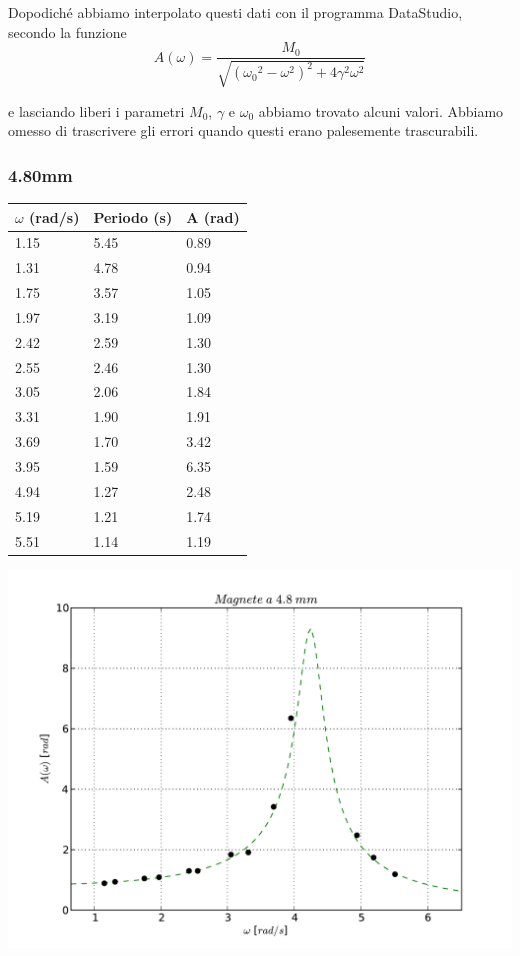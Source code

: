 \documentclass[a4paper,10pt]{report}
\begin{document}
Dopodiché abbiamo interpolato questi dati con il programma DataStudio, secondo la funzione
$$ A(\omega) = \frac{M_0}{\sqrt{ ({\omega_0}^2-\omega^2)^2 + 4\gamma^2\omega^2}} $$

e lasciando liberi i parametri $M_0$, $\gamma$ e $\omega_0$ abbiamo trovato alcuni valori. Abbiamo omesso di trascrivere gli errori quando questi erano palesemente trascurabili.

\clearpage

\subsubsection{4.80mm}
\begin{center}
\begin{tabular}{l|l|l}
$\omega$ (rad/s) & Periodo (s) & A (rad) \\
\midrule
1.15	& 5.45 & 0.89\\
1.31	& 4.78 & 0.94\\
1.75	& 3.57 & 1.05\\
1.97	& 3.19 & 1.09\\
2.42	& 2.59 & 1.30\\
2.55	& 2.46 & 1.30\\
3.05    & 2.06 & 1.84\\
3.31	& 1.90 & 1.91\\
3.69	& 1.70 & 3.42\\
3.95	& 1.59 & 6.35\\
4.94	& 1.27 & 2.48\\
5.19	& 1.21 & 1.74\\
5.51	& 1.14 & 1.19 \\
\midrule
\end{tabular}
\end{center}


\includegraphics[scale=0.75]{"../grafici/Magnetea48mm"}
\end{document}
